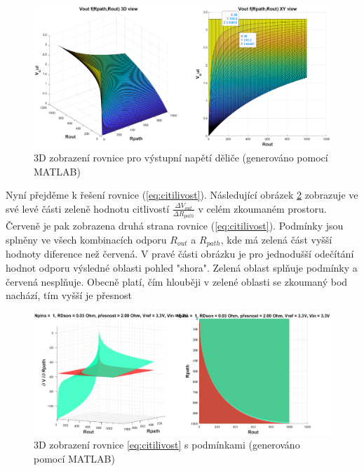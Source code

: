 \begin{figure}[ht!]
\centering
\includegraphics[width = 1\textwidth]{obrazky/Vout3D.eps}
\caption{3D zobrazení rovnice pro výstupní napětí děliče (generováno pomocí MATLAB) }
\label{fig:3D zobrazení rovnice pro výstupní napětí děliče}
\end{figure}

Nyní přejděme k řešení rovnice (\ref{eq:citilivost}). Následující obrázek \ref{fig: zobrazení df/dRpath}
zobrazuje ve své levé části zeleně hodnotu citlivostí $\frac{ \Delta V_{out} }{\Delta R_{path}}$
v celém zkoumaném prostoru. Červeně je pak zobrazena druhá strana rovnice (\ref{eq:citilivost}).
Podmínky jsou splněny ve všech kombinacích odporu $R_{out}$ a $R_{path}$, kde má zelená část
vyšší hodnoty diference než červená.
V pravé části obrázku je pro jednodušší odečítání hodnot odporu výsledné oblasti pohled "shora".
Zelená oblast splňuje podmínky a červená nesplňuje.
Obecně platí, čím hlouběji v zelené oblasti se zkoumaný bod nachází, tím vyšší je přesnost\par

\begin{figure}[ht!]
\centering
\includegraphics[width = 1\textwidth]{obrazky/general_dVF.eps}
\caption{3D zobrazení rovnice \ref{eq:citilivost} s podmínkami (generováno pomocí MATLAB)}
\label{fig: zobrazení df/dRpath}
\end{figure}

